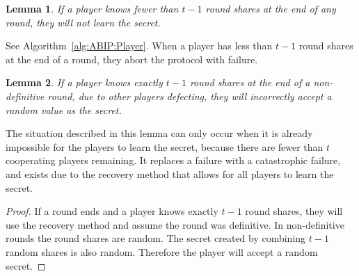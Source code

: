 \documentclass{dalcsthesis}
\newtheorem{lemma}{Lemma}
\begin{document}
\begin{lemma}\label{Lem:ABIP:FewSharesNolearn}If a player knows fewer than $t-1$ round shares at the end of any round, they will not learn the secret.\end{lemma}

See Algorithm~\ref{alg:ABIP:Player}. When a player has less than $t-1$ round shares at the end of a round, they abort the protocol with failure.

\begin{lemma}\label{Lem:ABIP:MissDefSharesLearnWrong}If a player knows exactly $t-1$ round shares at the end of a non-definitive round, due to other players defecting, they will incorrectly accept a random value as the secret.\end{lemma}

The situation described in this lemma can only occur when it is already impossible for the players to learn the secret, because there are fewer than $t$ cooperating players remaining. It replaces a failure with a catastrophic failure, and exists due to the recovery method that allows for all players to learn the secret.
 
\begin{proof}
If a round ends and a player knows exactly $t-1$ round shares, they will use the recovery method and assume the round was definitive. In non-definitive rounds the round shares are random. The secret created by combining $t-1$ random shares is also random. Therefore the player will accept a random secret.
\end{proof}
\end{document}
